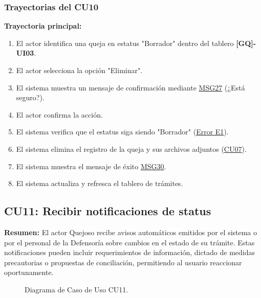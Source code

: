\begin{appendices}
\subsubsection{Trayectorias del CU10}
\textbf{Trayectoria principal:}
\begin{enumerate}[nosep]
    \item El actor identifica una queja en estatus "Borrador" dentro del tablero \textbf{[GQ]-UI03}.
    \item El actor selecciona la opción "Eliminar".
    \item El sistema muestra un mensaje de confirmación mediante \hyperlink{msg:MSG27}{MSG27} (¿Está seguro?).
    \item El actor confirma la acción.
    \item El sistema verifica que el estatus siga siendo "Borrador" (\hyperlink{err:E15}{Error E1}).
    \item El sistema elimina el registro de la queja y sus archivos adjuntos (\hyperlink{anexo:casos_uso}{CU07}).
    \item El sistema muestra el mensaje de éxito \hyperlink{msg:MSG30}{MSG30}.
    \item El sistema actualiza y refresca el tablero de trámites.
\end{enumerate}

\newpage

\subsection{CU11: Recibir notificaciones de status}

\textbf{Resumen:} 
El actor Quejoso recibe avisos automáticos emitidos por el sistema o por el personal de la Defensoría sobre cambios en el estado de su trámite. Estas notificaciones pueden incluir requerimientos de información, dictado de medidas precautorias o propuestas de conciliación, permitiendo al usuario reaccionar oportunamente.

\begin{figure}[htbp]
    \centering
    \figCUonce
    \caption{Diagrama de Caso de Uso CU11.}
    \label{fig:cu11}
\end{figure}


\end{appendices}
